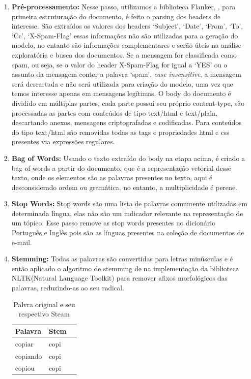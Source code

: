 \documentclass[12pt,a4paper]{article}
\begin{document}
  \begin{enumerate}
  \item \textbf{Pré-processamento:} Nesse passo, utilizamos a biblioteca Flanker, , para primeira estruturação do documento, é feito o parsing dos headers de interesse.
   São extraídos os valores dos headers ‘Subject’, ‘Date’, ‘From’, ‘To’, ‘Cc’, ‘X-Spam-Flag’ essas informações não são utilizadas para a geração do modelo,
   no entanto são informações complementares e serão úteis na análise exploratória e busca dos documentos. Se a mensagem for classificada como spam, ou seja, 
   se o valor do header X-Spam-Flag for igual a ‘YES’ ou o assunto da mensagem conter a palavra ‘spam’, \textit{case insensitive}, a mensagem será descartada e não será utilizada para criação do modelo,
   uma vez que temos interesse apenas em mensagens legítimas. O body do documento é dividido em múltiplas partes, cada parte possui seu próprio content-type,
   são processadas as partes com conteúdos de tipo text/html e text/plain, descartando anexos, mensagens criptografadas e codificadas. 
   Para conteúdos do tipo text/html são removidas todas as tags e propriedades html e css presentes via expressões regulares.
  \item \textbf{Bag of Words:} Usando o texto extraído do body na etapa acima, é criado a bag of words a partir do documento, que é a representação vetorial desse texto,
   onde os elementos são as palavras presentes no texto, aqui é desconsiderado ordem ou gramática, no entanto, a multiplicidade é perene.
  \item \textbf{Stop Words:} Stop words são uma lista de palavras comumente utilizadas em determinada língua, elas não são um indicador relevante na representação de um tópico.
   Esse passo remove as stop words presentes no dicionário Português e Inglês pois são as línguas presentes na coleção de documentos de e-mail.
  \item \textbf{Stemming:} Todas as palavras são convertidas para letras minúsculas e é então aplicado o algoritmo de stemming de 
   na implementação da biblioteca NLTK(Natural Language Toolkit)  para remover afixos morfológicos das palavras, reduzindo-as ao seu radical.
  
  
  \begin{table}[h]
    \centering
    \begin{tabular}{l l l}
    Palavra		&Stem &\\
    \hline
    copiar		&copi &\\
    copiando		&copi &\\
    copiou		&copi &\\
    \hline
    \end{tabular}
    \caption{Palvra original e seu respectivo Steam}
  \end{table}
  

\end{enumerate}
\end{document}
